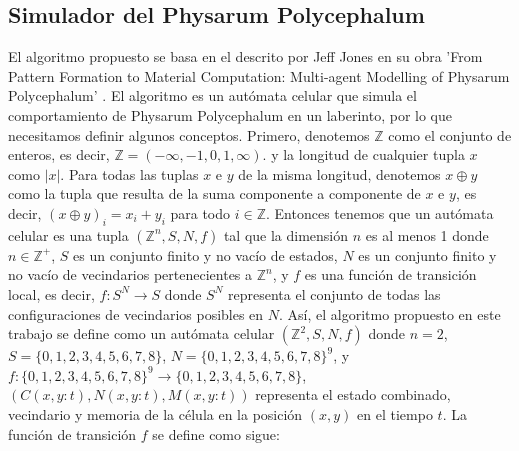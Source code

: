 \subsection{Simulador del Physarum Polycephalum} %
\label{sub:subsection name}

    El algoritmo propuesto se basa en el descrito por Jeff Jones en su obra 
    'From Pattern Formation to Material Computation: Multi-agent Modelling of Physarum Polycephalum' \cite{Jones2015}.
    \vskip 0.5cm
    El algoritmo es un aut\'omata celular que simula el comportamiento de Physarum Polycephalum en un laberinto, por lo que necesitamos definir algunos conceptos.
        Primero, denotemos $\mathbb{Z}$ como el conjunto de enteros, es decir, $\mathbb{Z} = (-\infty, -1, 0, 1, \infty)$.
        y la longitud de cualquier tupla $x$ como $|x|$. Para todas las tuplas $x$ e $y$ de la misma longitud, denotemos $x \oplus y$
        como la tupla que resulta de la suma componente a componente de $x$ e $y$, es decir, $(x \oplus y)_i = x_i + y_i$ para todo
    $i \in \mathbb{Z}$.
    \vskip 0.5cm
    Entonces tenemos que un aut\'omata celular es una tupla $(\mathbb{Z}^{n}, S, N, f)$ tal que la dimensi\'on $n$ es al menos 1 donde 
        $n \in \mathbb{Z}^{+}$, $S$ es un conjunto finito y no vac\'io de estados, $N$ es un conjunto finito y no vac\'io de vecindarios 
        pertenecientes a $\mathbb{Z}^{n}$, y $f$ es una funci\'on de transici\'on local, es decir, $f: S^N \rightarrow S$ donde
        $S^N$ representa el conjunto de todas las configuraciones de vecindarios posibles en $N$.
    \vskip 0.5cm
    As\'i, el algoritmo propuesto en este trabajo se define como un aut\'omata celular $(\mathbb{Z}^{2}, S, N, f)$ donde $n = 2$, 
        $S = \{0, 1, 2, 3, 4, 5, 6, 7, 8\}$, $N = \{0, 1, 2, 3, 4, 5, 6, 7, 8\}^9$, 
        y $f : \{0, 1, 2, 3, 4, 5, 6, 7, 8\}^9 \rightarrow \{0, 1, 2, 3, 4, 5, 6, 7, 8\}$,\((C(x,y:t), N(x,y:t), M(x,y:t)) \) 
        representa el estado combinado, vecindario y memoria de la c\'elula en la posici\'on \((x, y)\) en el tiempo \( t \). La funci\'on de transici\'on 
        \( f \) se define como sigue:
